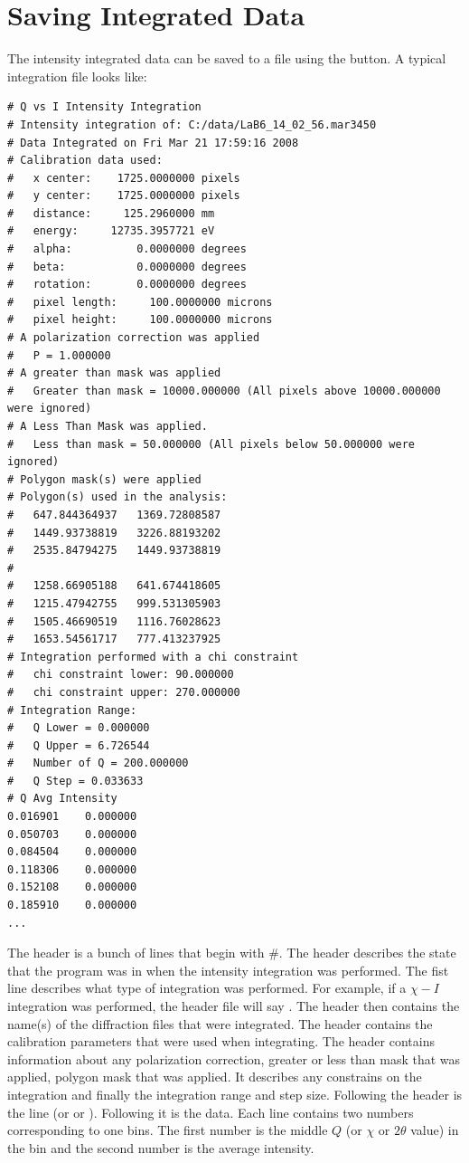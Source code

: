 \section{Saving Integrated Data}

The intensity integrated data can be saved to a file
using the  button. 
A typical integration file looks like:
\begin{lstlisting}[caption={'A Cake Data File'}]
# Q vs I Intensity Integration
# Intensity integration of: C:/data/LaB6_14_02_56.mar3450 
# Data Integrated on Fri Mar 21 17:59:16 2008
# Calibration data used:
#   x center:    1725.0000000 pixels
#   y center:    1725.0000000 pixels
#   distance:     125.2960000 mm
#   energy:     12735.3957721 eV
#   alpha:          0.0000000 degrees
#   beta:           0.0000000 degrees
#   rotation:       0.0000000 degrees
#   pixel length:     100.0000000 microns
#   pixel height:     100.0000000 microns
# A polarization correction was applied
#   P = 1.000000
# A greater than mask was applied
#   Greater than mask = 10000.000000 (All pixels above 10000.000000 were ignored)
# A Less Than Mask was applied.
#   Less than mask = 50.000000 (All pixels below 50.000000 were ignored)
# Polygon mask(s) were applied
# Polygon(s) used in the analysis:
#   647.844364937	1369.72808587
#   1449.93738819	3226.88193202
#   2535.84794275	1449.93738819
#
#   1258.66905188	641.674418605
#   1215.47942755	999.531305903
#   1505.46690519	1116.76028623
#   1653.54561717	777.413237925
# Integration performed with a chi constraint
#   chi constraint lower: 90.000000
#   chi constraint upper: 270.000000
# Integration Range:
#   Q Lower = 0.000000
#   Q Upper = 6.726544
#   Number of Q = 200.000000
#   Q Step = 0.033633
# Q	Avg Intensity
0.016901	0.000000
0.050703	0.000000
0.084504	0.000000
0.118306	0.000000
0.152108	0.000000
0.185910	0.000000
...
\end{lstlisting}
The header is a bunch of lines that begin with \#.
The header describes the state that the program was
in when the intensity integration was performed.
The fist line describes what type of integration was
performed. For example, if a $\chi-I$ integration was 
performed, the header file will say
.
The header then contains the name(s) of the diffraction
files that were integrated. The header contains the
calibration parameters that were used when integrating.
The header contains information about any polarization
correction, greater or less than mask that was applied,
polygon mask that was applied. It describes any constrains 
on the integration and finally the integration range and 
step size.  Following the header is the line
 (or 
or ). Following it is
the data. Each line contains two numbers corresponding to one bins. 
The first number is the middle $Q$ (or $\chi$ or $2\theta$ value) 
in the bin and the second number is the average intensity.
